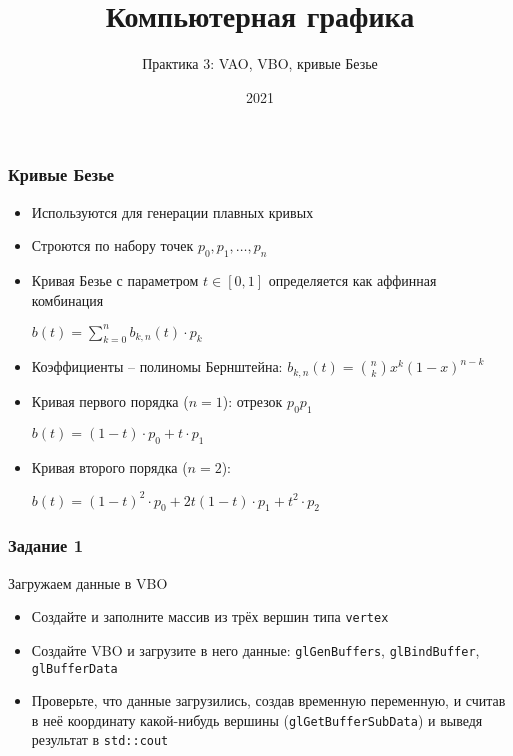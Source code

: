\documentclass{beamer}
\title{Компьютерная графика}
\subtitle{Практика 3: VAO, VBO, кривые Безье}
\date{2021}
\begin{document}
\frame{\titlepage}

\begin{frame}[fragile]
\frametitle{Кривые Безье}
\begin{itemize}
\item Используются для генерации плавных кривых
\item Строются по набору точек \begin{math}p_0, p_1, \dots, p_n\end{math}
\item Кривая Безье с параметром \begin{math}t \in [0, 1]\end{math} определяется как аффинная комбинация

\begin{math}
b(t) = \sum\limits_{k=0}^n b_{k,n}(t) \cdot p_k
\end{math}

\item Коэффициенты -- полиномы Бернштейна: \begin{math}b_{k,n}(t) = \binom{n}{k}x^k(1-x)^{n-k}\end{math}
\pause
\item Кривая первого порядка (\begin{math}n=1\end{math}): отрезок \begin{math}p_0 p_1\end{math}

\begin{math}b(t) = (1-t)\cdot p_0 + t \cdot p_1\end{math}
\pause
\item Кривая второго порядка (\begin{math}n=2\end{math}):

\begin{math}b(t) = (1-t)^2 \cdot p_0 + 2t(1-t) \cdot p_1 + t^2 \cdot p_2\end{math}
\end{itemize}
\end{frame}

\begin{frame}[fragile]
\frametitle{Задание 1}
Загружаем данные в VBO
\begin{itemize}
\item Создайте и заполните массив из трёх вершин типа \verb|vertex|
\item Создайте VBO и загрузите в него данные: \verb|glGenBuffers|, \verb|glBindBuffer|, \verb|glBufferData|
\item Проверьте, что данные загрузились, создав временную переменную, и считав в неё координату какой-нибудь вершины (\verb|glGetBufferSubData|) и выведя результат в \verb|std::cout|
\end{itemize}
\end{frame}
\end{document}
